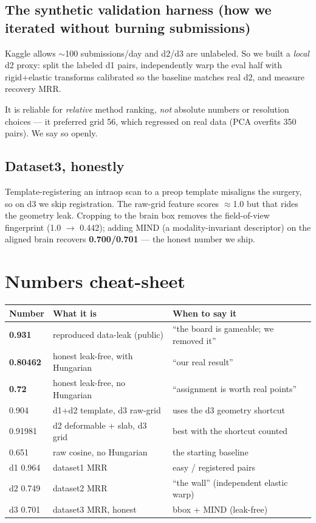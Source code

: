 \documentclass[12pt,a4paper]{article}
\begin{document}
\subsection{The synthetic validation harness (how we iterated without burning submissions)}
Kaggle allows $\sim$100 submissions/day and d2/d3 are unlabeled. So we built a \emph{local}
d2 proxy: split the labeled d1 pairs, independently warp the eval half with rigid+elastic
transforms calibrated so the baseline matches real d2, and measure recovery MRR.
\begin{misconception}
It is reliable for \emph{relative} method ranking, \emph{not} absolute numbers or
resolution choices — it preferred grid 56, which regressed on real data (PCA overfits 350
pairs). We say so openly.
\end{misconception}

\subsection{Dataset3, honestly}
Template-registering an intraop scan to a preop template misaligns the surgery, so on d3
we skip registration. The raw-grid feature scores $\approx$1.0 but that rides the geometry
leak. Cropping to the brain box removes the field-of-view fingerprint (1.0 $\rightarrow$
0.442); adding MIND (a modality-invariant descriptor) on the aligned brain recovers
\textbf{0.700/0.701} — the honest number we ship.

\section{Numbers cheat-sheet}
\begin{center}\small
\begin{tabularx}{\linewidth}{@{}l l X@{}}\toprule
\textbf{Number} & \textbf{What it is} & \textbf{When to say it}\\\midrule
\textbf{0.931}   & reproduced data-leak (public) & ``the board is gameable; we removed it''\\
\textbf{0.80462} & honest leak-free, with Hungarian & ``our real result''\\
\textbf{0.72}    & honest leak-free, no Hungarian & ``assignment is worth real points''\\
0.904            & d1+d2 template, d3 raw-grid & uses the d3 geometry shortcut\\
0.91981          & d2 deformable + slab, d3 grid & best with the shortcut counted\\
0.651            & raw cosine, no Hungarian & the starting baseline\\
d1 0.964         & dataset1 MRR & easy / registered pairs\\
d2 0.749         & dataset2 MRR & ``the wall'' (independent elastic warp)\\
d3 0.701         & dataset3 MRR, honest & bbox + MIND (leak-free)\\
\bottomrule\end{tabularx}\end{center}
\end{document}
